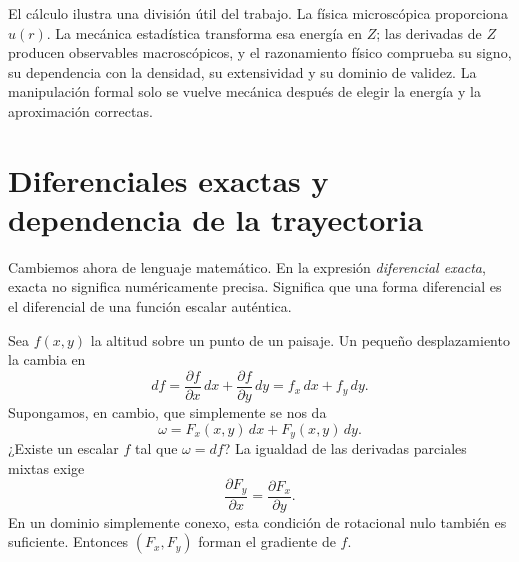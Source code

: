\begin{classroomqa}\end{classroomqa}

El cálculo ilustra una división útil del trabajo. La física microscópica proporciona \(u(r)\). La mecánica estadística transforma esa energía en \(Z\); las derivadas de \(Z\) producen observables macroscópicos, y el razonamiento físico comprueba su signo, su dependencia con la densidad, su extensividad y su dominio de validez. La manipulación formal solo se vuelve mecánica después de elegir la energía y la aproximación correctas.

\section{Diferenciales exactas y dependencia de la trayectoria}

Cambiemos ahora de lenguaje matemático. En la expresión \emph{diferencial exacta}, exacta no significa numéricamente precisa. Significa que una forma diferencial es el diferencial de una función escalar auténtica.

Sea \(f(x,y)\) la altitud sobre un punto de un paisaje. Un pequeño desplazamiento la cambia en \begin{equation}
 df=
 \frac{\partial f}{\partial x}\,dx+
 \frac{\partial f}{\partial y}\,dy
 =f_x\,dx+f_y\,dy.
 \label{eq:sm6-total-differential}
\end{equation} Supongamos, en cambio, que simplemente se nos da \begin{equation}
 \omega=F_x(x,y)\,dx+F_y(x,y)\,dy.
 \label{eq:sm6-one-form}
\end{equation} ¿Existe un escalar \(f\) tal que \(\omega=df\)? La igualdad de las derivadas parciales mixtas exige \begin{equation}
 \frac{\partial F_y}{\partial x}
 =
 \frac{\partial F_x}{\partial y}.
 \label{eq:sm6-exactness-condition}
\end{equation} En un dominio simplemente conexo, esta condición de rotacional nulo también es suficiente. Entonces \((F_x,F_y)\) forman el gradiente de \(f\).

